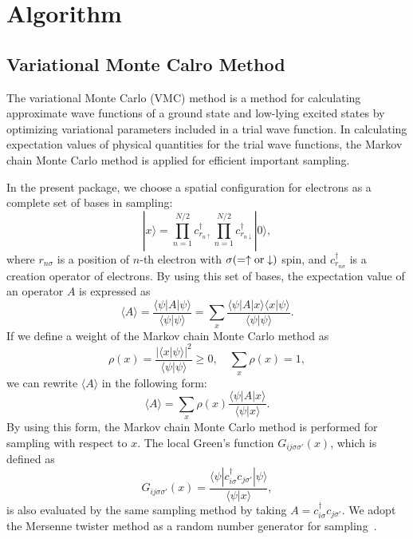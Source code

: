 \chapter{{Algorithm}}
\label{Ch:algorithm}
\section{Variational Monte Calro Method}

The variational Monte Carlo (VMC) method is a method for calculating approximate wave functions 
of a ground state and low-lying excited states by optimizing variational parameters included in a trial
wave function. 
In calculating expectation values of physical quantities for the trial wave functions,
the Markov chain Monte Carlo method is applied for efficient important sampling.

In the present package, we choose a spatial configuration for electrons as a complete set of bases in sampling:
\begin{equation}
| x\rangle =  \prod_{n=1}^{N/2} c_{r_{n\uparrow}}^{\dag} \prod_{n=1}^{N/2} c_{r_{n\downarrow}}^{\dag} |0 \rangle,
\end{equation}
where $r_{n\sigma}$ is a position of $n$-th electron with $\sigma (=\uparrow \rm{or} \downarrow)$ spin,
and $c_{r_{n\sigma}}^{\dag}$ is a creation operator of electrons.
By using this set of bases, the expectation value of an operator $A$ is expressed as
\begin{equation}
\langle A \rangle =\frac{\langle \psi| A| \psi \rangle}{\langle \psi | \psi \rangle} 
=\sum_x \frac{\langle \psi| A | x\rangle \langle x| \psi \rangle}{\langle \psi |\psi \rangle}.
\end{equation}
If we define a weight of the Markov chain Monte Carlo method as
\begin{equation}
\rho(x)=\frac{|\langle x| \psi \rangle|^2}{\langle \psi | \psi \rangle} \ge 0, \quad \sum_{x} \rho(x)=1,
\end{equation}
we can rewrite $\langle A \rangle$ in the following form:
\begin{equation}
\langle A \rangle =\sum_x \rho(x) \frac{\langle \psi| A | x\rangle }{\langle \psi |x \rangle}.
\end{equation}
By using this form, the Markov chain Monte Carlo method is performed for sampling
with respect to $x$. The local Green's function $G_{ij\sigma\sigma'}(x)$, which is defined as
\begin{equation}
G_{ij\sigma\sigma'}(x)=\frac{\langle \psi | c_{i\sigma}^{\dag} c_{j\sigma'} | \psi \rangle}{\langle \psi | x \rangle},
\end{equation}
is also evaluated by the same sampling method by taking $A = c_{i\sigma}^{\dag} c_{j\sigma'}$.
We adopt the Mersenne twister method as a random number generator for sampling~\cite{Mutsuo2008}. 

